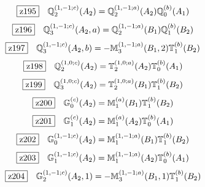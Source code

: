 \documentclass[fleqn,10pt,landscape]{jsarticle}
\begin{document}
\begin{dmath*}
\hspace*{3mm}\fbox{z195}\quad \mathbb{Q}_{2}^{(1,-1;c)}(A_{2})=\mathbb{Q}_{2}^{(1,-1;a)}(A_{2}) \mathbb{Q}_{0}^{(b)}(A_{1})
\end{dmath*}
\begin{dmath*}
\hspace*{3mm}\fbox{z196}\quad \mathbb{Q}_{3}^{(1,-1;c)}(A_{2},a)=\mathbb{Q}_{2}^{(1,-1;a)}(B_{1}) \mathbb{Q}_{1}^{(b)}(B_{2})
\end{dmath*}
\begin{dmath*}
\hspace*{3mm}\fbox{z197}\quad \mathbb{Q}_{3}^{(1,-1;c)}(A_{2},b)=- \mathbb{M}_{3}^{(1,-1;a)}(B_{1},2) \mathbb{T}_{1}^{(b)}(B_{2})
\end{dmath*}
\begin{dmath*}
\hspace*{3mm}\fbox{z198}\quad \mathbb{Q}_{2}^{(1,0;c)}(A_{2})=\mathbb{T}_{2}^{(1,0;a)}(A_{2}) \mathbb{T}_{0}^{(b)}(A_{1})
\end{dmath*}
\begin{dmath*}
\hspace*{3mm}\fbox{z199}\quad \mathbb{Q}_{3}^{(1,0;c)}(A_{2})=\mathbb{T}_{2}^{(1,0;a)}(B_{1}) \mathbb{T}_{1}^{(b)}(B_{2})
\end{dmath*}
\begin{dmath*}
\hspace*{3mm}\fbox{z200}\quad \mathbb{G}_{0}^{(c)}(A_{2})=\mathbb{M}_{1}^{(a)}(B_{1}) \mathbb{T}_{1}^{(b)}(B_{2})
\end{dmath*}
\begin{dmath*}
\hspace*{3mm}\fbox{z201}\quad \mathbb{G}_{1}^{(c)}(A_{2})=\mathbb{M}_{1}^{(a)}(A_{2}) \mathbb{T}_{0}^{(b)}(A_{1})
\end{dmath*}
\begin{dmath*}
\hspace*{3mm}\fbox{z202}\quad \mathbb{G}_{0}^{(1,-1;c)}(A_{2})=\mathbb{M}_{1}^{(1,-1;a)}(B_{1}) \mathbb{T}_{1}^{(b)}(B_{2})
\end{dmath*}
\begin{dmath*}
\hspace*{3mm}\fbox{z203}\quad \mathbb{G}_{1}^{(1,-1;c)}(A_{2})=\mathbb{M}_{1}^{(1,-1;a)}(A_{2}) \mathbb{T}_{0}^{(b)}(A_{1})
\end{dmath*}
\begin{dmath*}
\hspace*{3mm}\fbox{z204}\quad \mathbb{G}_{2}^{(1,-1;c)}(A_{2},1)=- \mathbb{M}_{3}^{(1,-1;a)}(B_{1},1) \mathbb{T}_{1}^{(b)}(B_{2})
\end{dmath*}
\end{document}
